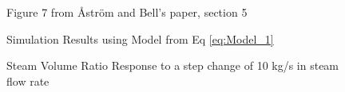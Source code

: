         \begin{figure}[ht]
            \begin{center}
                
                Figure 7 from \r{A}str\"{o}m and Bell's paper, section 5 \cite{Astrom}
                
                
                Simulation Results using Model from Eq \eqref{eq:Model_1}
                
                \caption{Steam Volume Ratio Response to a step change of 10 kg/s in steam flow rate}
                \label{fig:Fig7E}
            \end{center}
        \end{figure}  %

